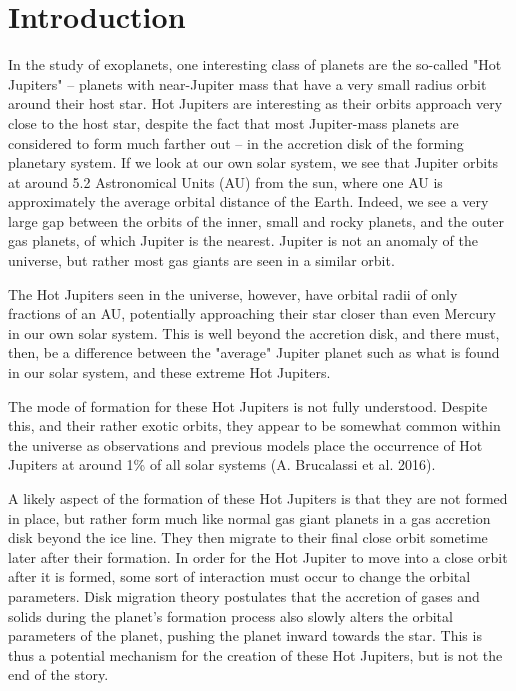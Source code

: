 \documentclass[12pt]{article}
\begin{document}
\clearpage

\section{Introduction}

In the study of exoplanets, one interesting class of planets are the so-called "Hot Jupiters" -- planets with near-Jupiter mass that have a 
very small radius orbit around their host star. 
Hot Jupiters are interesting as their orbits approach very close to the host star,
despite the fact that most Jupiter-mass planets are considered to form much farther
out -- in the accretion disk of the forming planetary system. If we look at our own
solar system, we see that Jupiter orbits at around 5.2 Astronomical Units (AU) from the
sun, where one AU is approximately the average orbital distance of the Earth. Indeed,
we see a very large gap between the orbits of the inner, small and rocky planets, and
the outer gas planets, of which Jupiter is the nearest. Jupiter is not an anomaly of
the universe, but rather most gas giants are seen in a similar orbit. 

The Hot Jupiters seen in the universe, however, have orbital 
radii of only fractions of an AU, potentially 
approaching their star closer than even Mercury in our own solar system.
This is well beyond the accretion disk, and there must, then, be a difference between
the "average" Jupiter planet such as what is found in our solar system, and these
extreme Hot Jupiters.

The mode of formation for these Hot Jupiters is not fully understood.
Despite this, and their rather exotic orbits, 
they appear to be somewhat common within the universe as observations and previous models place the occurrence of Hot Jupiters at around 1\% of all solar systems (A. Brucalassi et al. 2016).  

A likely aspect of the formation of these Hot Jupiters is that they are not formed in place, but rather form much like normal gas giant planets 
in a gas accretion disk beyond the ice line. They then migrate to their final close orbit sometime later after their formation. 
In order for the Hot Jupiter to move into a close orbit after it is formed, some sort of interaction must occur to change the orbital parameters. 
Disk migration theory postulates that the accretion of gases and 
solids during the planet's formation process also slowly alters the orbital 
parameters of the planet,
pushing the planet inward towards the star.
This is thus a potential mechanism for the creation of these Hot Jupiters, but is not the end of the story.
\end{document}
